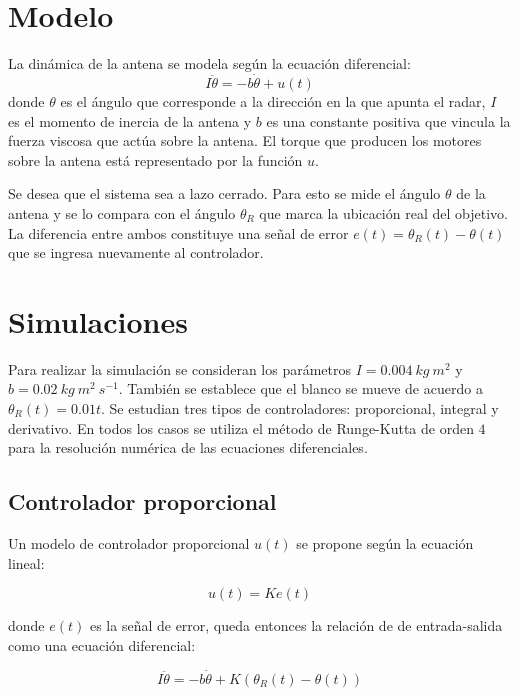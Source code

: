 \documentclass{sig-alternate}
\begin{document}
\section{Modelo}\label{modelo}
La din\'{a}mica de la antena se modela seg\'{u}n la ecuaci\'{o}n diferencial:
\begin{equation}
\label{dinamica_antena}
I \ddot\theta = - b \dot\theta + u(t)
\end{equation}
donde $\theta$ es el \'{a}ngulo que corresponde a la direcci\'{o}n en la que
apunta el radar, $I$ es el momento de inercia de la antena y $b$ es una 
constante positiva que vincula la fuerza viscosa que act\'{u}a sobre la antena.
El torque que producen los motores sobre la antena est\'{a} representado por 
la funci\'{o}n $u$.

Se desea que el sistema sea a lazo cerrado. Para esto se mide el \'{a}ngulo
$\theta$ de la antena y se lo compara con el \'{a}ngulo $\theta_{R}$ que marca
la ubicaci\'{o}n real del objetivo. La diferencia entre ambos constituye una
se\~{n}al de error $e(t) = \theta_{R}(t) - \theta(t)$ que se ingresa nuevamente 
al controlador.

\section{Simulaciones}\label{simulaciones}
Para realizar la simulaci\'{o}n se consideran los par\'{a}metros 
$I = 0.004\ kg\ m^{2}$ y $b = 0.02\ kg\  m^{2}\ s^{-1}$. Tambi\'{e}n se establece
que el blanco se mueve de acuerdo a $\theta_{R}(t) = 0.01 t$.
Se estudian tres tipos de controladores: proporcional, integral y derivativo.
En todos los casos se utiliza el m\'{e}todo de Runge-Kutta de orden $4$ para
la resoluci\'{o}n num\'{e}rica de las ecuaciones diferenciales.

\subsection{Controlador proporcional}\label{proporcional}
Un modelo de controlador proporcional $u(t)$ se propone seg\'{u}n la ecuaci\'{o}n lineal:

\begin{equation}
\label{error_modelo}
u(t) = K e(t)
\end{equation}

donde $e(t)$ es la se\~nal de error, queda entonces la relaci\'{o}n de de entrada-salida como una ecuaci\'{o}n diferencial:

\begin{equation}
\label{ecuacion_modelo1}
I \ddot\theta = - b \dot\theta + K(\theta_R(t) - \theta(t))
\end{equation}
\end{document}

